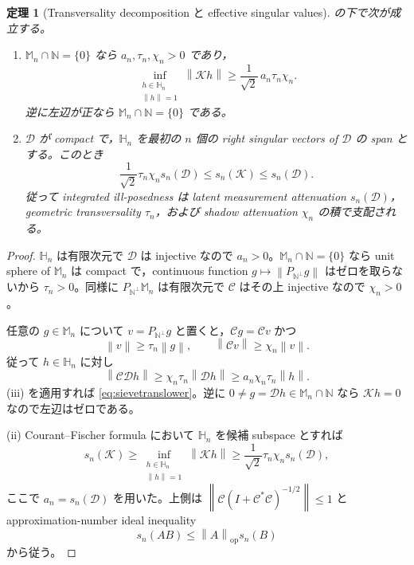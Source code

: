 \documentclass[11pt,a4paper]{ltjsarticle}
\newtheorem{theorem}{定理}[section]
\theoremstyle{remark}
\newcommand{\norm}[1]{\left\lVert#1\right\rVert}
\newcommand{\Cop}{\mathscr C}
\newcommand{\Jcal}{\mathscr D}
\newcommand{\Kop}{\mathscr K}
\newcommand{\op}{\operatorname{op}}
\begin{document}
\begin{theorem}[Transversality decomposition と effective singular values]\label{thm:continuoussv}
の下で次が成立する。
\begin{enumerate}[label=(\roman*)]
\item $\mathbb M_n\cap\mathbb N=\{0\}$ なら $a_n,\tau_n,\chi_n>0$ であり，
\begin{equation}
\inf_{\substack{h\in\mathbb H_n\\\norm h=1}}
\norm{\Kop h}
\ge
\frac1{\sqrt2}\,a_n\tau_n\chi_n.
\label{eq:sievetranslower}
\end{equation}
逆に左辺が正なら $\mathbb M_n\cap\mathbb N=\{0\}$ である。
\item $\Jcal$ が compact で，$\mathbb H_n$ を最初の $n$ 個の right singular vectors of $\Jcal$ の span とする。このとき
\begin{equation}
\frac1{\sqrt2}\tau_n\chi_n s_n(\Jcal)
\le s_n(\Kop)
\le s_n(\Jcal).
\label{eq:svcontinuousbound}
\end{equation}
従って integrated ill-posedness は latent measurement attenuation $s_n(\Jcal)$，geometric transversality $\tau_n$，および shadow attenuation $\chi_n$ の積で支配される。
\end{enumerate}
\end{theorem}

\begin{proof}
$\mathbb H_n$ は有限次元で $\Jcal$ は injective なので $a_n>0$。$\mathbb M_n\cap\mathbb N=\{0\}$ なら unit sphere of $\mathbb M_n$ は compact で，continuous function $g\mapsto\norm{P_{\mathbb N^\perp}g}$ はゼロを取らないから $\tau_n>0$。同様に $P_{\mathbb N^\perp}\mathbb M_n$ は有限次元で $\Cop$ はその上 injective なので $\chi_n>0$。

任意の $g\in\mathbb M_n$ について $v=P_{\mathbb N^\perp}g$ と置くと，$\Cop g=\Cop v$ かつ
\[
\norm v\ge\tau_n\norm g,
\qquad
\norm{\Cop v}\ge\chi_n\norm v.
\]
従って $h\in\mathbb H_n$ に対し
\[
\norm{\Cop\Jcal h}
\ge\chi_n\tau_n\norm{\Jcal h}
\ge a_n\chi_n\tau_n\norm h.
\]
(iii) を適用すれば \eqref{eq:sievetranslower}。逆に $0\ne g=\Jcal h\in\mathbb M_n\cap\mathbb N$ なら $\Kop h=0$ なので左辺はゼロである。

(ii) Courant--Fischer formula において $\mathbb H_n$ を候補 subspace とすれば
\[
s_n(\Kop)
\ge
\inf_{\substack{h\in\mathbb H_n\\\norm h=1}}
\norm{\Kop h}
\ge\frac1{\sqrt2}\tau_n\chi_ns_n(\Jcal),
\]
ここで $a_n=s_n(\Jcal)$ を用いた。上側は $\norm{\Cop(I+\Cop^*\Cop)^{-1/2}}\le1$ と approximation-number ideal inequality
\[
s_n(AB)\le\norm A_{\op}s_n(B)
\]
から従う。
\end{proof}
\end{document}
